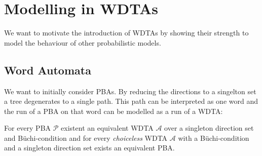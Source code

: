 \section{Modelling in \acp*{WDTA}}
We want to motivate the introduction of \acp{WDTA} by showing their strength to
model the behaviour of other probabilistic models. 
\subsection{Word Automata}
We want to initially consider \acp{PBA}. By reducing the directions to a 
singelton set a tree degenerates to a single path. This path can be interpreted 
as one word and the run of a \ac{PBA} on that word can be modelled as a run of 
a \ac{WDTA}:
\begin{theorem}
  For every \ac{PBA} $\mathcal{P}$ existent an equivalent \ac{WDTA}
  $\mathcal{A}$ over a singleton direction set and Büchi-condition and for 
  every \emph{choiceless} \ac{WDTA} $\mathcal{A}$ with a Büchi-condition and a
  singleton direction set exists an equivalent \ac{PBA}.
  \label{theorem:pbaequiv}
\end{theorem}
